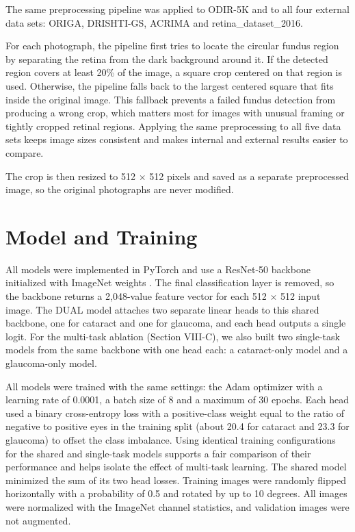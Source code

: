 \documentclass[conference,a4paper]{IEEEtran}
\begin{document}
The same preprocessing pipeline was applied to ODIR-5K and to all four external data sets: ORIGA,
DRISHTI-GS, ACRIMA and retina\_dataset\_2016.

For each photograph, the pipeline first tries to locate the circular fundus region by separating the
retina from the dark background around it. If the detected region covers at least 20\% of the image,
a square crop centered on that region is used. Otherwise, the pipeline falls back to the largest
centered square that fits inside the original image. This fallback prevents a failed fundus detection
from producing a wrong crop, which matters most for images with unusual framing or tightly cropped
retinal regions. Applying the same preprocessing to all five data sets keeps image sizes consistent and makes internal and external results easier to compare.

The crop is then resized to 512 \(\times\) 512 pixels and saved as a separate preprocessed image, so
the original photographs are never modified.

\section{Model and Training}

All models were implemented in PyTorch and use a ResNet-50 backbone \cite{ref25} initialized with ImageNet weights \cite{ref26}. The
final classification layer is removed, so the backbone returns a 2,048-value feature vector for each
512 \(\times\) 512 input image. The DUAL model attaches two separate linear heads to this shared
backbone, one for cataract and one for glaucoma, and each head outputs a single logit. For the
multi-task ablation (Section VIII-C), we also built two single-task models from the same backbone
with one head each: a cataract-only model and a glaucoma-only model.

All models were trained with the same settings: the Adam optimizer \cite{ref27} with a learning rate
of 0.0001, a batch size of 8 and a maximum of 30 epochs. Each head used a binary cross-entropy loss
with a positive-class weight equal to the ratio of negative to positive eyes in the training split
(about 20.4 for cataract and 23.3 for glaucoma) to offset the class imbalance. Using identical training configurations for the shared and single-task models supports a fair comparison of their performance and helps isolate the effect of multi-task learning. The shared model
minimized the sum of its two head losses. Training images were randomly flipped horizontally with a
probability of 0.5 and rotated by up to 10 degrees. All images were normalized with the ImageNet
channel statistics, and validation images were not augmented.
\end{document}
